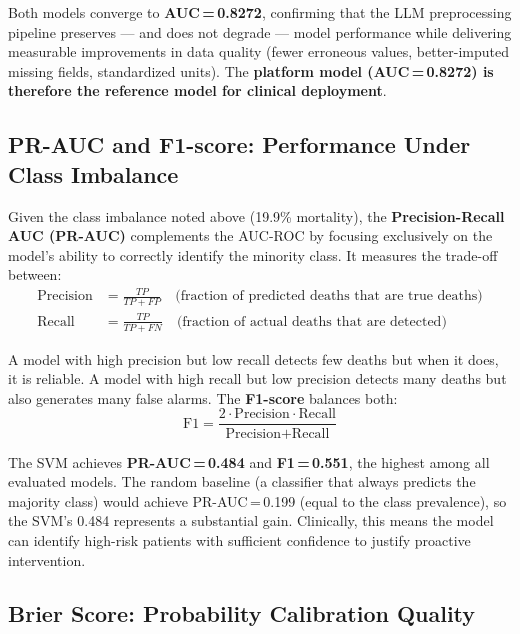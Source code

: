 \documentclass[12pt,a4paper,twoside]{report}
\begin{document}
Both models converge to \textbf{AUC\,=\,0.8272}, confirming that the LLM preprocessing pipeline preserves — and does not degrade — model performance while delivering measurable improvements in data quality (fewer erroneous values, better-imputed missing fields, standardized units). The \textbf{platform model (AUC\,=\,0.8272) is therefore the reference model for clinical deployment}.

\subsection{PR-AUC and F1-score: Performance Under Class Imbalance}

Given the class imbalance noted above (19.9\% mortality), the \textbf{Precision-Recall AUC (PR-AUC)} complements the AUC-ROC by focusing exclusively on the model's ability to correctly identify the minority class. It measures the trade-off between:
\begin{align}
\text{Precision} &= \frac{TP}{TP + FP}
  \quad \text{(fraction of predicted deaths that are true deaths)} \label{eq:precision}\\[4pt]
\text{Recall} &= \frac{TP}{TP + FN}
  \quad \text{(fraction of actual deaths that are detected)} \label{eq:recall}
\end{align}

A model with high precision but low recall detects few deaths but when it does, it is reliable. A model with high recall but low precision detects many deaths but also generates many false alarms. The \textbf{F1-score} balances both:
\begin{equation}
\text{F1} = \frac{2 \cdot \text{Precision} \cdot \text{Recall}}{\text{Precision} + \text{Recall}}
\label{eq:f1}
\end{equation}

The SVM achieves \textbf{PR-AUC\,=\,0.484} and \textbf{F1\,=\,0.551}, the highest among all evaluated models. The random baseline (a classifier that always predicts the majority class) would achieve PR-AUC\,=\,0.199 (equal to the class prevalence), so the SVM's 0.484 represents a substantial gain. Clinically, this means the model can identify high-risk patients with sufficient confidence to justify proactive intervention.

\subsection{Brier Score: Probability Calibration Quality}
\end{document}
